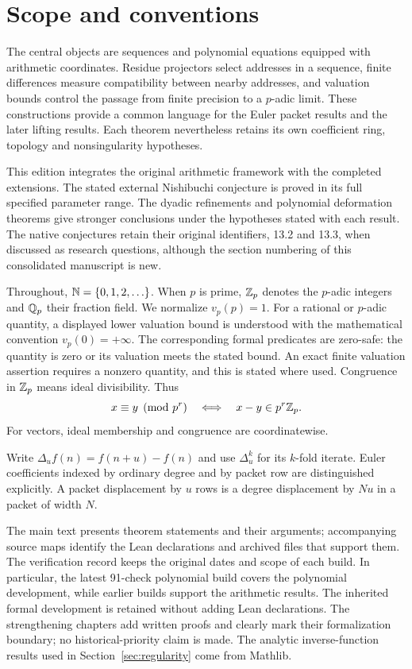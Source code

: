 \section{Scope and conventions}
\label{sec:scope}
The central objects are sequences and polynomial equations equipped with
arithmetic coordinates. Residue projectors select addresses in a sequence,
finite differences measure compatibility between nearby addresses, and
valuation bounds control the passage from finite precision to a $p$-adic
limit. These constructions provide a common language for the Euler packet
results and the later lifting results. Each theorem nevertheless retains its
own coefficient ring, topology and nonsingularity hypotheses.

This edition integrates the original arithmetic framework with the completed
extensions. The stated external Nishibuchi conjecture is proved in its full
specified parameter range. The dyadic refinements and polynomial deformation theorems give stronger
conclusions under the hypotheses stated with each result. The native conjectures retain their original
identifiers, 13.2 and 13.3, when discussed as research questions, although the
section numbering of this consolidated manuscript is new.

Throughout, $\mathbb N=\{0,1,2,\ldots\}$. When $p$ is prime, $\mathbb Z_p$ denotes the
$p$-adic integers and $\mathbb Q_p$ their fraction field. We normalize $v_p(p)=1$.
For a rational or $p$-adic quantity, a displayed lower valuation bound is
understood with the mathematical convention $v_p(0)=+\infty$.
The corresponding formal predicates are zero-safe: the quantity is zero or
its valuation meets the stated bound. An exact finite valuation assertion
requires a nonzero quantity, and this is stated where used. Congruence in
$\mathbb Z_p$ means ideal divisibility. Thus
\[
 x\equiv y\pmod{p^r}\quad\Longleftrightarrow\quad
 x-y\in p^r\mathbb Z_p.
\]
For vectors, ideal membership and congruence are coordinatewise.

Write $\Delta_u f(n)=f(n+u)-f(n)$ and use $\Delta_u^k$ for its $k$-fold
iterate. Euler coefficients indexed by ordinary degree and by packet row are
distinguished explicitly. A packet displacement by $u$ rows is a degree
displacement by $Nu$ in a packet of width $N$.

The main text presents theorem statements and their arguments; accompanying
source maps identify the Lean declarations and archived files that support
them. The verification record keeps the original dates and scope of each
build. In particular, the latest 91-check polynomial build covers the
polynomial development, while earlier builds support the arithmetic results.
The inherited formal development is retained without adding Lean declarations. The strengthening chapters add written proofs and clearly mark their formalization boundary; no historical-priority claim is made. The analytic inverse-function results
used in Section~\ref{sec:regularity} come from Mathlib.
